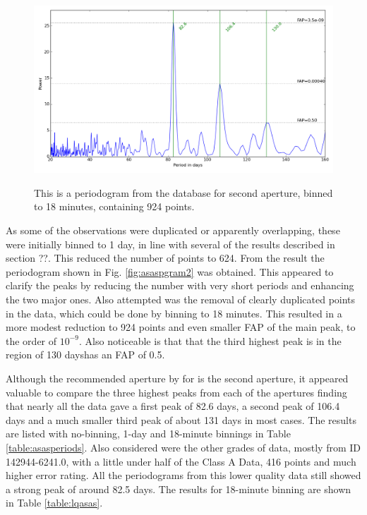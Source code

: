 \begin{figure}[!htbp]
\begin{center}
\includegraphics[scale=0.30]{Figures/asasbin18min.png} \\
\end{center}
\caption{This is a periodogram from the {\asas} database for {\prox} second aperture, binned to 18 minutes, containing 924 points.}
\protect\label{fig:asaspgram3}
\end{figure}

As some of the observations were duplicated or apparently overlapping, these were initially binned to 1 day, in line
with several of the {\harps} results described in section ??. This reduced the number of points to 624. From the result
the periodogram shown in Fig. \ref{fig:asaspgram2} was obtained. This appeared to clarify the peaks by reducing the
number with very short periods and enhancing the two major ones. Also attempted was the removal of clearly duplicated
points in the data, which could be done by binning to 18 minutes. This resulted in a more modest reduction to 924 points
and even smaller FAP of the main peak, to the order of $10^{-9}$. Also noticeable is that that the third highest peak is
in the region of 130 dayshas an FAP of 0.5.

Although the recommended aperture by {\asas} for {\prox} is the second aperture, it appeared valuable to compare the
three highest peaks from each of the apertures finding that nearly all the data gave a first peak of 82.6 days, a second
peak of 106.4 days and a much smaller third peak of about 131 days in most cases. The results are listed with
no-binning, 1-day and 18-minute binnings in Table \ref{table:asasperiods}. Also considered were the other grades of
{\asas} data, mostly from ID 142944-6241.0, with a little under half of the Class A Data, 416 points and much higher
error rating. All the periodograms from this lower quality data still showed a strong peak of around 82.5 days. The
results for 18-minute binning are shown in Table \ref{table:lqasas}.


